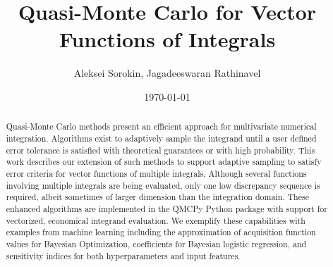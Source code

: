 \documentclass{article}[12pt]
\title{Quasi-Monte Carlo for Vector Functions of Integrals}
\author{Aleksei Sorokin, Jagadeeswaran Rathinavel}
\date{\today}
\begin{document}
\maketitle

\begin{abstract}
Quasi-Monte Carlo methods present an efficient approach for multivariate numerical integration. Algorithms exist to adaptively sample the integrand until a user defined error tolerance is satisfied with theoretical guarantees or with high probability. This work describes our extension of such methods to support adaptive sampling to satisfy error criteria for vector functions of multiple integrals. Although several functions involving multiple integrals are being evaluated, only one low discrepancy sequence is required, albeit sometimes of larger dimension than the integration domain. These enhanced algorithms are implemented in the QMCPy Python package with support for vectorized, economical integrand evaluation. We exemplify these capabilities with examples from machine learning including the approximation of acquisition function values for Bayesian Optimization, coefficients for Bayesian logistic regression, and sensitivity indices for both hyperparameters and input features.
\end{abstract}

\tableofcontents

\newpage 

\end{document}
